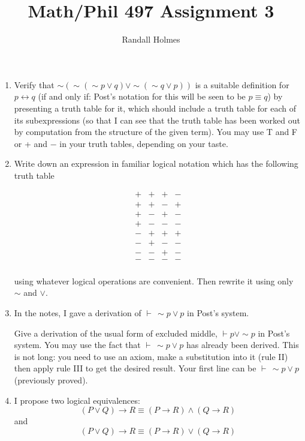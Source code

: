 \documentclass[12pt]{article}
\title{Math/Phil 497 Assignment 3}
\author{Randall Holmes}
\begin{document}
\maketitle

\begin{enumerate}

\item Verify that $\sim(\sim(\sim p \vee q) \vee \sim(\sim q \vee p))$ is a suitable definition for $p \leftrightarrow q$ (if and only if:  Post's notation for this will be seen to be $p \equiv q$)
by presenting a truth table for it, which should include a truth table for each of its subexpressions (so that I can see that the truth table has been worked out by computation from the structure of the given term).  You may use T and F or + and $-$ in your truth tables, depending on your taste.

\item Write down an expression in familiar logical notation which has the following truth table

$$\begin{array}{c|c|c||c}

+ & + & + &  - \\
+ & + & - &  + \\
+ & - & + &  - \\
+ & - & - &  - \\
- & + & + &  + \\
- & + & - &  - \\
- & - & + &  - \\
- & - & - &  - \\

\end{array}$$

using whatever logical operations are convenient.  Then rewrite it using only $\sim$ and $\vee$.



\item In the notes, I gave a derivation of $\vdash\, \sim p \vee p$ in Post's system.

Give a derivation of the usual form of excluded middle, $\vdash p \vee \sim p$ in Post's system.  You may use the fact that $\vdash\, \sim p \vee p$ has already been derived.
This is not long:  you need to use an axiom, make a substitution into it (rule II) then apply rule III to get the desired result.  Your first line can be $\vdash\, \sim p \vee p$ (previously proved).

\item  I propose two logical equivalences:  $$(P \vee Q)  \rightarrow R \equiv (P \rightarrow R) \wedge (Q \rightarrow R)$$ and $$(P \vee Q)  \rightarrow R \equiv (P \rightarrow R) \vee (Q \rightarrow R)$$


\end{enumerate}
\end{document}
